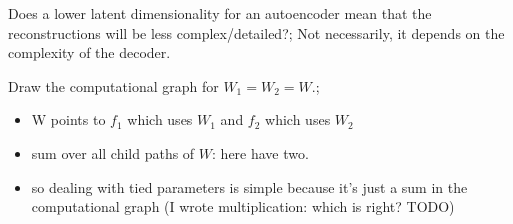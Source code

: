 \documentclass{article}
\begin{document}
Does a lower latent dimensionality for an autoencoder mean that the reconstructions will be less complex/detailed?; Not necessarily, it depends on the complexity of the decoder.

Draw the computational graph for $W_1 = W_2 = W$.; \begin{itemize} \item W points to $f_1$ which uses $W_1$ and $f_2$ which uses $W_2$ \item sum over all child paths of $W$: here have two. \item so dealing with tied parameters is simple because it's just a sum in the computational graph (I wrote multiplication: which is right? TODO) \end{itemize}
\end{document}
